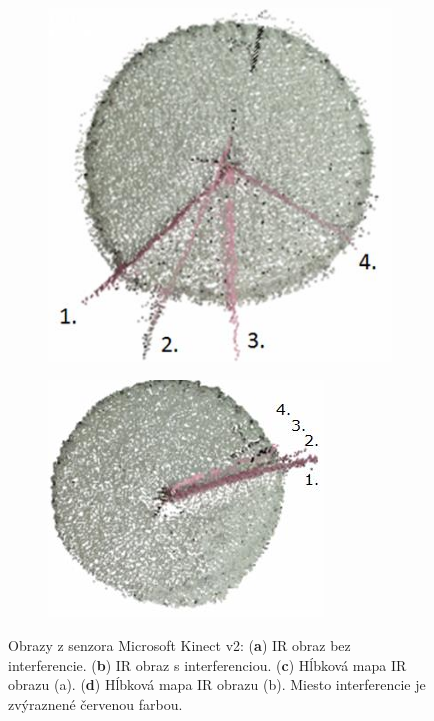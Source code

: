 \begin{figure}[h]
	\centering
	\begin{subfigure}[b]{0.42\textwidth}
		\centering
		\includegraphics[width=\textwidth]{figures/dynamic_result_seq.png}
		\caption{}
		\label{fig:depthir:a}
	\end{subfigure}
	\hfill
	\begin{subfigure}[b]{0.42\textwidth}
		\centering
		\includegraphics[width=\textwidth]{figures/dynamic_result_par.png}
		\caption{}
		\label{fig:depthir:b}
	\end{subfigure}
	\caption{Obrazy z senzora Microsoft Kinect v2: (\textbf{a}) IR obraz bez interferencie. (\textbf{b}) IR obraz s interferenciou. (\textbf{c}) Hĺbková mapa IR obrazu (a). (\textbf{d}) Hĺbková mapa IR obrazu (b). Miesto interferencie je zvýraznené červenou farbou.}
	\label{fig:depthir}
\end{figure}

